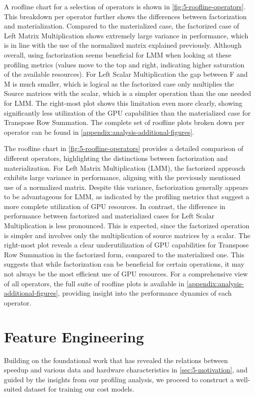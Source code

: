 A roofline chart for a selection of operators is shown in \autoref{fig:5-roofline-operators}. This breakdown per operator further shows the differences between factorization and materialization. Compared to the materialized case, the factorized case of Left Matrix Multiplication shows extremely large variance in performance, which is in line with the use of the normalized matrix explained previously. Although overall, using factorization seems beneficial for LMM when looking at these profiling metrics (values move to the top and right, indicating higher saturation of the available resources). For Left Scalar Multiplication the gap between F and M is much smaller, which is logical as the factorized case only multiplies the Source matrices with the scalar, which is a simpler operation than the one needed for LMM. The right-most plot shows this limitation even more clearly, showing significantly less utilization of the GPU capabilities than the materialized case for Transpose Row Summation. The complete set of roofline plots broken down per operator can be found in \autoref{appendix:analysis-additional-figures}.

The roofline chart in \autoref{fig:5-roofline-operators} provides a detailed comparison of different operators, highlighting the distinctions between factorization and materialization. For Left Matrix Multiplication (LMM), the factorized approach exhibits large variance in performance, aligning with the previously mentioned use of a normalized matrix. Despite this variance, factorization generally appears to be advantageous for LMM, as indicated by the profiling metrics that suggest a more complete utilization of GPU resources. In contrast, the difference in performance between factorized and materialized cases for Left Scalar Multiplication is less pronounced. This is expected, since the factorized operation is simpler and involves only the multiplication of source matrices by a scalar. The right-most plot reveals a clear underutilization of GPU capabilities for Transpose Row Summation in the factorized form, compared to the materialized one. This suggests that while factorization can be beneficial for certain operations, it may not always be the most efficient use of GPU resources. For a comprehensive view of all operators, the full suite of roofline plots is available in \autoref{appendix:analysis-additional-figures}, providing insight into the performance dynamics of each operator.

\section{Feature Engineering}
\label{sec:5-feature-engineering}
Building on the foundational work that has revealed the relations between speedup and various data and hardware characteristics in \autoref{sec:5-motivation}, and guided by the insights from our profiling analysis, we proceed to construct a well-suited dataset for training our cost models.

